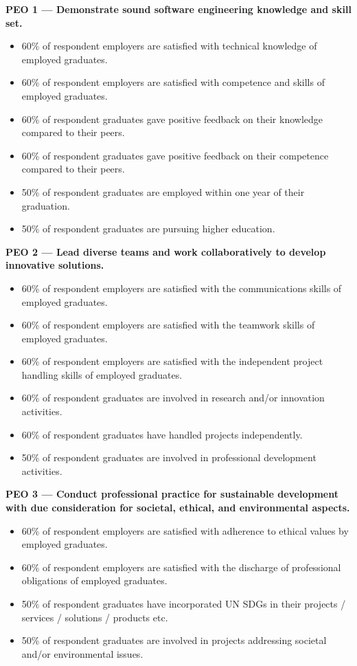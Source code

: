 \noindent\textbf{PEO 1 --- Demonstrate sound software engineering knowledge and skill set.}
\begin{itemize}[leftmargin=1.5em,topsep=2pt]
\item 60\% of respondent employers are satisfied with technical knowledge of employed graduates.
\item 60\% of respondent employers are satisfied with competence and skills of employed graduates.
\item 60\% of respondent graduates gave positive feedback on their knowledge compared to their peers.
\item 60\% of respondent graduates gave positive feedback on their competence compared to their peers.
\item 50\% of respondent graduates are employed within one year of their graduation.
\item 50\% of respondent graduates are pursuing higher education.
\end{itemize}

\noindent\textbf{PEO 2 --- Lead diverse teams and work collaboratively to develop innovative solutions.}
\begin{itemize}[leftmargin=1.5em,topsep=2pt]
\item 60\% of respondent employers are satisfied with the communications skills of employed graduates.
\item 60\% of respondent employers are satisfied with the teamwork skills of employed graduates.
\item 60\% of respondent employers are satisfied with the independent project handling skills of employed graduates.
\item 60\% of respondent graduates are involved in research and/or innovation activities.
\item 60\% of respondent graduates have handled projects independently.
\item 50\% of respondent graduates are involved in professional development activities.
\end{itemize}

\noindent\textbf{PEO 3 --- Conduct professional practice for sustainable development with due consideration for societal, ethical, and environmental aspects.}
\begin{itemize}[leftmargin=1.5em,topsep=2pt]
\item 60\% of respondent employers are satisfied with adherence to ethical values by employed graduates.
\item 60\% of respondent employers are satisfied with the discharge of professional obligations of employed graduates.
\item 50\% of respondent graduates have incorporated UN SDGs in their projects / services / solutions / products etc.
\item 50\% of respondent graduates are involved in projects addressing societal and/or environmental issues.
\end{itemize}

